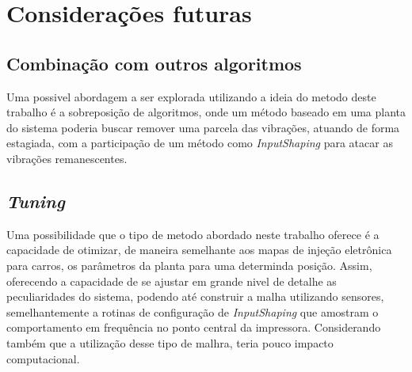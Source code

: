 \section{Considerações futuras}
\subsection{Combinação com outros algoritmos}
Uma possivel abordagem a ser explorada utilizando a ideia do metodo deste trabalho é a sobreposição de algoritmos, onde
um método baseado em uma planta do sistema poderia buscar remover uma parcela das vibrações, atuando de forma estagiada,
com a participação de um método como \textit{InputShaping} para atacar as vibrações remanescentes.

\subsection{\textit{Tuning}}
Uma possibilidade que o tipo de metodo abordado neste trabalho oferece é a capacidade de otimizar, de maneira
semelhante aos mapas de injeção eletrônica para carros, os parâmetros da planta para uma determinda posição.
Assim, oferecendo a capacidade de se ajustar em grande nivel de detalhe as peculiaridades do sistema, podendo até
construir a malha utilizando sensores, semelhantemente a rotinas de configuração de \textit{InputShaping} que amostram
o comportamento em frequência no ponto central da impressora. Considerando também que a utilização desse tipo de malhra,
teria pouco impacto computacional.


